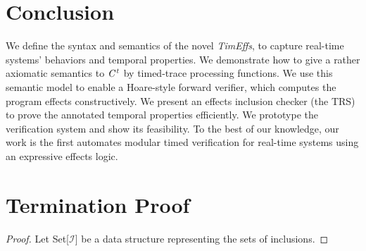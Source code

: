 \documentclass[acmsmall,10pt,review]{acmart}
\newcommand{\timedEffects}{\emph{TimEffs}}
\newcommand{\code}[1]{{\tt{\ensuremath{\m{#1}}}}}
\newcommand{\m}{\mathit}
\newcommand{\inclusion}{\code{\mathcal{I}}}
\newcommand{\timedL}{\code{C^{t}}}
\begin{document}
{{{%
%


\section{Conclusion}
\label{sec:conclusion}
We define the syntax and semantics of the novel \timedEffects, 
to capture real-time systems' behaviors and  temporal properties. 
We demonstrate how to give a rather axiomatic semantics to 
\code{\timedL} by timed-trace processing functions. We use 
this semantic model to enable  a Hoare-style forward verifier,  
which computes the program effects constructively.
We present an effects inclusion checker (the TRS) to prove the 
annotated temporal properties efficiently. We prototype the 
verification system and show its feasibility.
To the best of our knowledge, our work is the first 
automates modular timed verification for real-time systems 
using an expressive effects logic. 










\appendix

\section{Termination Proof}  \label{proof:TerminationProof}

\begin{proof}\label{proof:termination} 
Let Set[\inclusion] be a data structure representing the sets of inclusions. 


\end{proof}}}}
\end{document}

